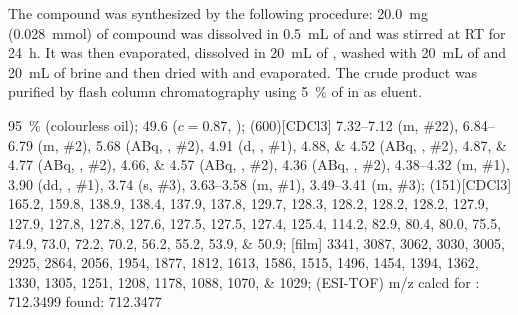 The compound was synthesized by the following procedure:
\SI{20.0}{\milli\gram} (\SI{0.028}{\milli\mol}) of compound  was dissolved in \SI{0.5}{\milli\liter} of  and was stirred at RT for \SI{24}{\hour}.
It was then evaporated, dissolved in \SI{20}{\milli\liter} of ,
washed with \SI{20}{\milli\liter} of  and \SI{20}{\milli\liter} of brine and then dried with  and evaporated.
The crude product was purified by flash column chromatography using \SI{5}{\percent} of  in  as eluent.
\begin{fullexp}
	 \SI{95}{\percent} (colourless oil); 
	\data{[$\alpha^{23}_D$]~$=$} \num{49.6} ($c = 0.87$, ); 
	\NMR(600)[CDCl3] \numrange{7.32}{7.12} (m, \#{22}), \numrange{6.84}{6.79} (m, \#{2}), \num{5.68} (ABq, , \#{2}), \num{4.91} (d, , \#{1}), \numlist{4.88;4.52} (ABq, , \#{2}), \numlist{4.87;4.77} (ABq, , \#{2}), \numlist{4.66;4.57} (ABq, , \#{2}), \num{4.36} (ABq, , \#{2}), \numrange{4.38}{4.32} (m, \#{1}), \num{3.90} (dd, , \#{1}), \num{3.74} (s, \#{3}), \numrange{3.63}{3.58} (m, \#{1}), \numrange{3.49}{3.41} (m, \#{3}); 
	(151)[CDCl3] \numlist{165.2; 159.8; 138.9; 138.4; 137.9; 137.8; 129.7; 128.3; 128.2; 128.2; 128.2; 127.9; 127.9; 127.8; 127.8; 127.6; 127.5; 127.5; 127.4; 125.4; 114.2; 82.9; 80.4; 80.0; 75.5; 74.9; 73.0; 72.2; 70.2; 56.2; 55.2; 53.9; 50.9}; 
	[film] \numlist{3341; 3087; 3062; 3030; 3005; 2925; 2864; 2056; 1954; 1877; 1812; 1613; 1586; 1515; 1496; 1454; 1394; 1362; 1330; 1305; 1251; 1208; 1178; 1088; 1070; 1029}; 
	 (ESI-TOF) m/z calcd for : \num{712.3499} found: \num{712.3477}
\end{fullexp}

